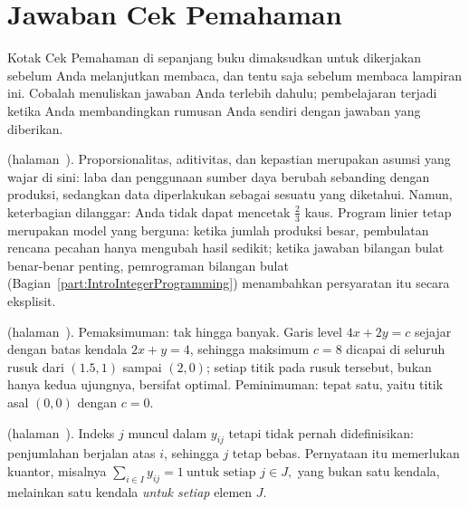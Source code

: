 
\chapter{Jawaban Cek Pemahaman}
\label{ch:checkpoint-answers}

Kotak Cek Pemahaman di sepanjang buku dimaksudkan untuk dikerjakan sebelum Anda melanjutkan membaca, dan tentu saja sebelum membaca lampiran ini. Cobalah menuliskan jawaban Anda terlebih dahulu; pembelajaran terjadi ketika Anda membandingkan rumusan Anda sendiri dengan jawaban yang diberikan.

\bigskip

\noindent\textbf{} (halaman~\pageref{lc:lp-assumptions}).
Proporsionalitas, aditivitas, dan kepastian merupakan asumsi yang wajar di sini: laba dan penggunaan sumber daya berubah sebanding dengan produksi, sedangkan data diperlakukan sebagai sesuatu yang diketahui. Namun, keterbagian dilanggar: Anda tidak dapat mencetak $\tfrac23$ kaus. Program linier tetap merupakan model yang berguna: ketika jumlah produksi besar, pembulatan rencana pecahan hanya mengubah hasil sedikit; ketika jawaban bilangan bulat benar-benar penting, pemrograman bilangan bulat (Bagian~\ref{part:IntroIntegerProgramming}) menambahkan persyaratan itu secara eksplisit.

\medskip

\noindent\textbf{} (halaman~\pageref{lc:how-many-optima}).
Pemaksimuman: tak hingga banyak. Garis level $4x+2y=c$ sejajar dengan batas kendala $2x+y=4$, sehingga maksimum $c=8$ dicapai di seluruh rusuk dari $(1.5,1)$ sampai $(2,0)$; setiap titik pada rusuk tersebut, bukan hanya kedua ujungnya, bersifat optimal. Peminimuman: tepat satu, yaitu titik asal $(0,0)$ dengan $c=0$.

\medskip

\noindent\textbf{} (halaman~\pageref{lc:missing-index}).
Indeks $j$ muncul dalam $y_{ij}$ tetapi tidak pernah didefinisikan: penjumlahan berjalan atas $i$, sehingga $j$ tetap bebas. Pernyataan itu memerlukan kuantor, misalnya
\(\sum_{i \in I} y_{ij} = 1 \ \text{untuk setiap } j \in J,\)
yang bukan satu kendala, melainkan satu kendala \emph{untuk setiap} elemen $J$.

\medskip

